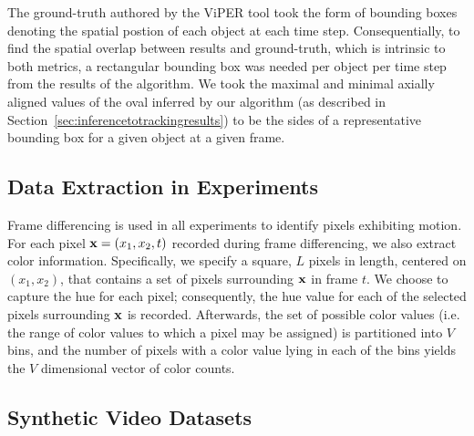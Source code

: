 \documentclass[twocolumn, final]{svjour3}
\begin{document}
The ground-truth authored by the ViPER tool took the form of bounding boxes denoting the spatial postion of each object at each time step. Consequentially, to find the spatial overlap between results and ground-truth, which is intrinsic to both metrics, a rectangular bounding box was needed per object per time step from the results of the algorithm. We took the maximal and minimal axially aligned values of the oval inferred by our algorithm (as described in Section~\ref{sec:inferencetotrackingresults}) to be the sides of a representative bounding box for a given object at a given frame.



\subsection{Data Extraction in Experiments}
\label{sec:dataextractioninexperiments}

Frame differencing is used in all experiments to identify pixels exhibiting motion. 
For each pixel $\bold{x} = ( x_{1}, x_{2}, t )$ recorded during frame differencing, we also extract color information. Specifically, we specify a square, $L$ pixels in length, centered on $(x_{1}, x_{2})$, that contains a set of pixels surrounding $\bold{x}$ in frame $t$. We choose to capture the hue for each pixel; consequently, the hue value for each of the selected pixels surrounding $\bold{x}$ is recorded. Afterwards, the set of possible color values (i.e. the range of color values to which a pixel may be assigned) is partitioned into $V$ bins, and the number of pixels with a color value lying in each of the bins yields the $V$ dimensional vector of color counts.



\subsection{Synthetic Video Datasets}
\label{sec:syntheticvideodatasets}
\end{document}
